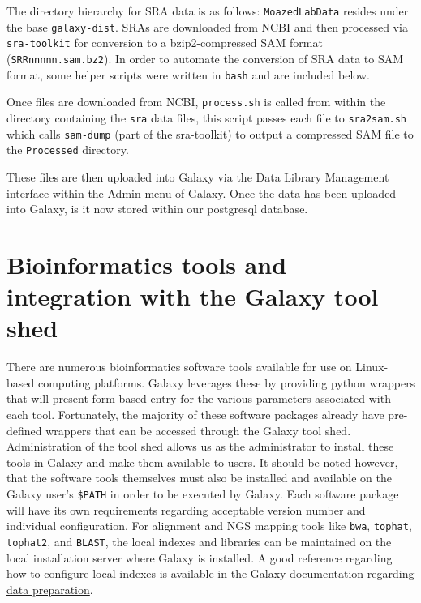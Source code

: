 \documentclass[a4paper,10pt]{article}
\begin{document}
\noindent The directory hierarchy for SRA data is as follows:\vspace{1em}
\vspace{1em}
\texttt{\footnotesize{MoazedLabData}} resides under the base \texttt{\footnotesize{galaxy-dist}}.  SRAs are downloaded from NCBI and then processed via \texttt{\footnotesize{sra-toolkit}} for conversion to a bzip2-compressed SAM format (\texttt{\footnotesize{SRRnnnnn.sam.bz2}}).
In order to automate the conversion of SRA data to SAM format, some helper scripts were written in \texttt{\footnotesize{bash}} and are included below.



Once files are downloaded from NCBI, \texttt{\footnotesize{process.sh}} is called from within the directory containing the \texttt{\footnotesize{sra}} data files, this script passes each file to \texttt{\footnotesize{sra2sam.sh}} which calls \texttt{\footnotesize{sam-dump}} (part of the sra-toolkit) to output a compressed SAM file to the \texttt{\footnotesize{Processed}} directory.

These files are then uploaded into Galaxy via the Data Library Management interface within the Admin menu of Galaxy.  Once the data has been uploaded into Galaxy, is it now stored within our postgresql database.

\section{Bioinformatics tools and integration with the Galaxy tool shed}
There are numerous bioinformatics software tools available for use on Linux-based computing platforms.  Galaxy leverages these by providing python wrappers that will present form based entry for the various parameters associated with each tool.  Fortunately, the majority of these software packages already have pre-defined wrappers that can be accessed through the Galaxy tool shed.  Administration of the tool shed allows us as the administrator to install these tools in Galaxy and make them available to users.  It should be noted however, that the software tools themselves must also be installed and available on the Galaxy user's \texttt{\footnotesize{\$PATH}} in order to be executed by Galaxy.  Each software package will have its own requirements regarding acceptable version number and individual configuration.  For alignment and NGS mapping tools like \texttt{\footnotesize{bwa}}, \texttt{\footnotesize{tophat}}, \texttt{\footnotesize{tophat2}}, and \texttt{\footnotesize{BLAST}}, the local indexes and libraries can be maintained on the local installation server where Galaxy is installed.  A good reference regarding how to configure local indexes is available in the Galaxy documentation regarding \href{https://wiki.galaxyproject.org/Admin/DataPreparation}{data preparation}.
\end{document}
